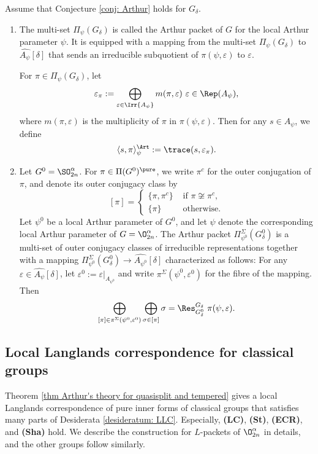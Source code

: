 \documentclass[11pt,letterpaper]{amsart}
\numberwithin{equation}{section}
\begin{document}
\begin{definition}\label{def A packet SO 2n}
Assume that Conjecture \ref{conj: Arthur} holds for $G_{\delta}$.
\begin{enumerate}
    \item The multi-set $\Pi_{\psi}(G_{\delta})$ is called the Arthur packet of $G$ for the local Arthur parameter $\psi$. It is equipped with a mapping  from the multi-set $\Pi_{\psi}(G_{\delta})$ to $\widehat{A_{\psi}}[\delta]$ that sends an irreducible subquotient of $\pi(\psi, \varepsilon)$ to $\varepsilon$. 

    For $\pi\in \Pi_{\psi}(G_{\delta})$, let 
    \[ \varepsilon_{\pi}:= \bigoplus_{\varepsilon \in \Irr{A_{\psi}}} m(\pi, \varepsilon) \ \varepsilon  \in \Rep(A_{\psi}),\]
where $m(\pi, \varepsilon)$ is the multiplicity of $\pi$ in $\pi(\psi, \varepsilon).$ Then for any $s \in A_{\psi}$, we define
\[ \langle s ,\pi \rangle_{\psi}^{\Art}:= \trace(s, \varepsilon_{\pi}).\]    
    \item Let  $G^0=\SO_{2n}^{\alpha}$. For $\pi \in \Pi(G^0)^\pure$, we write $\pi^c$ for the outer conjugation of $\pi$, and denote its outer conjugacy class by
    \[ [\pi]= \begin{cases}
        \{\pi, \pi^c\} & \text{ if }\pi\not\cong \pi^c,\\
        \{\pi\} & \text{ otherwise.}
    \end{cases} \]
    Let  $\psi^0$ be  a local Arthur parameter of $G^0$, and let $\psi$ denote the corresponding local Arthur parameter of $G= \O_{2n}^{\alpha}$. The Arthur packet $\Pi_{\psi^0}^{\Sigma}(G^0_{\delta})$ is a multi-set of outer conjugacy classes of irreducible representations together with a mapping $\Pi_{\psi^0}^{\Sigma}(G_{\delta}^0) \to \widehat{A_{\psi^0}}[\delta]$ characterized as follows: For any $\varepsilon \in \widehat{A_{\psi}}[\delta]$, let $\varepsilon^0:= \varepsilon|_{A_{\psi^0}}$ and write $\pi^{\Sigma}(\psi^0, \varepsilon^0)$ for the fibre of the mapping. Then
    \[ \bigoplus_{[\pi] \in \pi^{\Sigma}(\psi^0, \varepsilon^0)}  \bigoplus_{\sigma \in [\pi]}\sigma=  \Res_{G_{\delta}^0}^{G_{\delta}} \ \pi(\psi,\varepsilon).\]
\end{enumerate}
\end{definition}

\subsection{Local Langlands correspondence for classical groups}\label{sec verification for hypotehsis on LLC for classical groups}
Theorem \ref{thm Arthur's theory for quasisplit and tempered} gives a local Langlands correspondence of pure inner forms of classical groups that satisfies many parts of Desiderata \ref{desideratum: LLC}. Especially, \textbf{(LC)}, \textbf{(St)}, \textbf{(ECR)}, and \textbf{(Sha)} hold.  We describe the construction for $L$-packets of $\O_{2n}^{\alpha}$ in details, and the other groups follow similarly.
\end{document}
